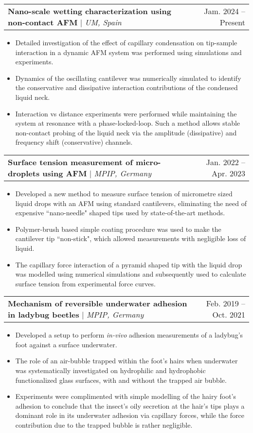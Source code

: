 \documentclass[letterpaper,11pt]{article}
\makeatletter
\newcommand{\resumeItem}[1]{
	\item\small{
		{#1 \vspace{-2pt}}
	}
}
\newcommand{\resumeProjectHeading}[2]{
	\item
	\begin{tabular*}{0.97\textwidth}{l@{\extracolsep{\fill}}r}
		\small#1 & #2 \\
	\end{tabular*}\vspace{-7pt}
}
\newcommand{\resumeItemListStart}{\begin{itemize}}
\newcommand{\resumeItemListEnd}{\end{itemize}\vspace{-5pt}}
\makeatother
\begin{document}
	\resumeProjectHeading
	{\textbf{Nano-scale wetting characterization using non-contact AFM} $|$ \emph{UM, Spain}}{Jam. 2024 -- Present}
	\resumeItemListStart
	\resumeItem{Detailed investigation of the effect of capillary condensation on tip-sample interaction in a dynamic AFM system was performed using simulations and experiments.}
	\resumeItem{Dynamics of the oscillating cantilever was numerically simulated to identify the conservative and dissipative interaction contributions of the condensed liquid neck.}
	\resumeItem{Interaction vs distance experiments were performed while maintaining the system at resonance with a phase-locked-loop. Such a method allows stable non-contact probing of the liquid neck via the amplitude (dissipative) and frequency shift (conservative) channels.}
	\resumeItemListEnd
	
	\resumeProjectHeading
	{\textbf{Surface tension measurement of micro-droplets using AFM} $|$ \emph{MPIP, Germany}}{Jan. 2022 -- Apr. 2023}
	\resumeItemListStart
	\resumeItem{Developed a new method to measure surface tension of micrometre sized liquid drops with an AFM using standard cantilevers, eliminating the need of expensive ``nano-needle" shaped tips used by state-of-the-art methods.}
	\resumeItem{Polymer-brush based simple coating procedure was used to make the cantilever tip ``non-stick", which allowed measurements with negligible loss of liquid.}
	\resumeItem{The capillary force interaction of a pyramid shaped tip with the liquid drop was modelled using numerical simulations and subsequently used to calculate surface tension from experimental force curves.}
	\resumeItemListEnd

	\resumeProjectHeading
	{\textbf{Mechanism of reversible underwater adhesion in ladybug beetles} $|$ \emph{MPIP, Germany}}{Feb. 2019 -- Oct. 2021}
	\resumeItemListStart
	\resumeItem{Developed a setup to perform \emph{in-vivo} adhesion measurements of a ladybug's foot against a surface underwater.}
	\resumeItem{The role of an air-bubble trapped within the foot's hairs when underwater was systematically investigated on hydrophilic and hydrophobic functionalized glass surfaces, with and without the trapped air bubble.}
	\resumeItem{Experiments were complimented with simple modelling of the hairy foot's adhesion to conclude that the insect's oily secretion at the hair's tips plays a dominant role in its underwater adhesion via capillary forces, while the force contribution due to the trapped bubble is rather negligible.}
	\resumeItemListEnd
	
	\vspace{4pt}
	
\end{document}
